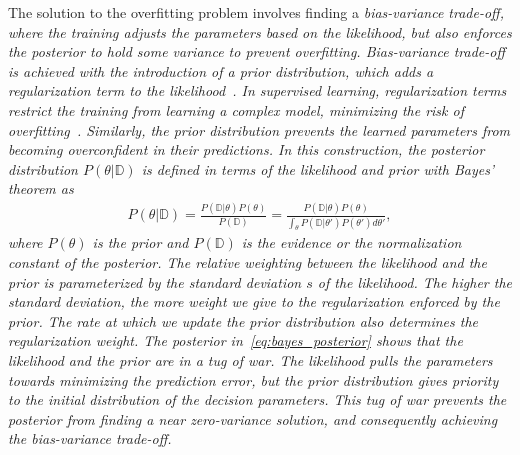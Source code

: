 The solution to the overfitting problem involves finding a \it{bias-variance
trade-off}\normalfont, where the training adjusts the parameters based on the
likelihood, but also enforces the posterior to hold some variance to prevent
overfitting.
%
%
Bias-variance trade-off is achieved with the introduction of a prior
distribution, which adds a regularization term to the
likelihood~\cite{bishop2006pattern}.
%
In supervised learning, regularization terms restrict the training from learning
a complex model, minimizing the risk of overfitting~\cite{santos2022avoiding}.
%
Similarly, the prior distribution prevents the learned parameters from becoming
\it{overconfident} \normalfont in their predictions.
%
In this construction, the posterior distribution $P(\theta | \mathbb{D})$ is
defined in terms of the likelihood and prior with Bayes' theorem as 
\begin{align}
  P(\theta | \mathbb{D}) = \frac{P(\mathbb{D} | \theta) P(\theta) }{P(\mathbb{D})}
  = \frac{P(\mathbb{D} | \theta) P(\theta) }{\int_\theta P(\mathbb{D} | \theta') P(\theta')  d\theta'}, 
  \label{eq:bayes_posterior}
\end{align}
where  $P(\theta)$ is the prior and $P(\mathbb{D})$ is the evidence or the
normalization constant of the posterior.
%
The relative weighting between the likelihood and the prior is parameterized by
the standard deviation $s$ of the likelihood. The higher the standard deviation,
the more weight we give to the regularization enforced by the prior.
%
The rate at which we update the prior distribution also determines the
regularization weight.
%
The posterior in~\eqref{eq:bayes_posterior} shows that the likelihood and the
prior are in a tug of war. The likelihood pulls the parameters towards
minimizing the prediction error, but the prior distribution gives priority to the
initial distribution of the decision parameters.
%
This tug of war prevents the posterior from finding a near zero-variance
solution, and consequently achieving the bias-variance trade-off.

